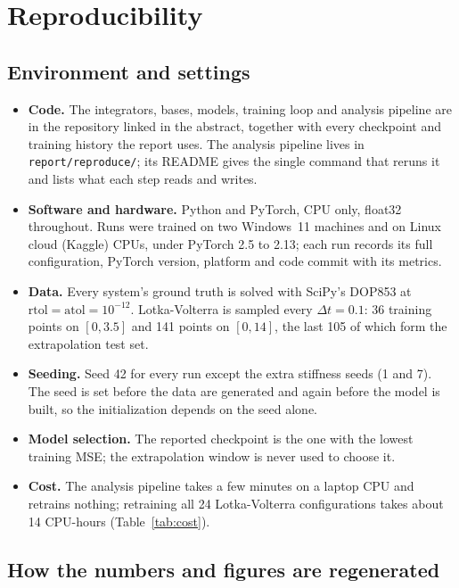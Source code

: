 \section{Reproducibility}
\label{app:repro}

\subsection{Environment and settings}

\begin{itemize}[leftmargin=*,itemsep=1pt,topsep=2pt]
\item \textbf{Code.} The integrators, bases, models, training loop and
  analysis pipeline are in the repository linked in the abstract, together
  with every checkpoint and training history the report uses. The analysis
  pipeline lives in \texttt{report/reproduce/}; its README gives the single
  command that reruns it and lists what each step reads and writes.
\item \textbf{Software and hardware.} Python and PyTorch, CPU only, float32
  throughout. Runs were trained on two Windows~11 machines and on Linux cloud
  (Kaggle) CPUs, under PyTorch 2.5 to 2.13; each run records its full
  configuration, PyTorch version, platform and code commit with its metrics.
\item \textbf{Data.} Every system's ground truth is solved with SciPy's
  DOP853 at $\text{rtol}=\text{atol}=10^{-12}$. Lotka-Volterra is sampled
  every $\Delta t=0.1$:
  36 training points on $[0,3.5]$ and 141 points on $[0,14]$, the last
  105 of which form the extrapolation test set.
\item \textbf{Seeding.} Seed 42 for every run except the extra stiffness
  seeds (1 and 7). The seed is set before the data are generated and again
  before the model is built, so the initialization depends on the seed alone.
\item \textbf{Model selection.} The reported checkpoint is the one with the
  lowest training MSE; the extrapolation window is never used to choose it.
\item \textbf{Cost.} The analysis pipeline takes a few minutes on a laptop
  CPU and retrains nothing; retraining all 24 Lotka-Volterra configurations
  takes about 14 CPU-hours (Table~\ref{tab:cost}).
\end{itemize}

\subsection{How the numbers and figures are regenerated}

